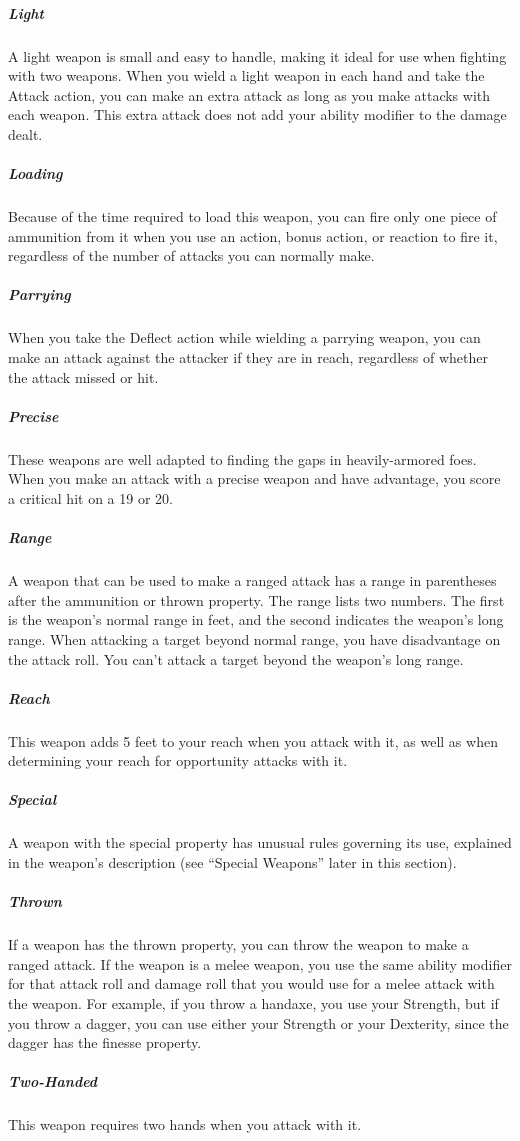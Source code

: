 \subparagraph*{Light} A light weapon is small and easy to handle, making it ideal for use when fighting with two weapons. When you wield a light weapon in each hand and take the Attack action, you can make an extra attack as long as you make attacks with each weapon. This extra attack does not add your ability modifier to the damage dealt.

\subparagraph*{Loading} Because of the time required to load this weapon, you can fire only one piece of ammunition from it when you use an action, bonus action, or reaction to fire it, regardless of the number of attacks you can normally make.

\subparagraph*{Parrying} When you take the Deflect action while wielding a parrying weapon, you can make an attack against the attacker if they are in reach, regardless of whether the attack missed or hit.

\subparagraph*{Precise} These weapons are well adapted to finding the gaps in heavily-armored foes. When you make an attack with a precise weapon and have advantage, you score a critical hit on a 19 or 20.

\subparagraph*{Range} A weapon that can be used to make a ranged attack has a range in parentheses after the ammunition or thrown property. The range lists two numbers. The first is the weapon's normal range in feet, and the second indicates the weapon's long range. When attacking a target beyond normal range, you have disadvantage on the attack roll. You can't attack a target beyond the weapon's long range.

\subparagraph*{Reach} This weapon adds 5 feet to your reach when you attack with it, as well as when determining your reach for opportunity attacks with it.

\subparagraph*{Special} A weapon with the special property has unusual rules governing its use, explained in the weapon's description (see “Special Weapons” later in this section).

\subparagraph*{Thrown} If a weapon has the thrown property, you can throw the weapon to make a ranged attack. If the weapon is a melee weapon, you use the same ability modifier for that attack roll and damage roll that you would use for a melee attack with the weapon. For example, if you throw a handaxe, you use your Strength, but if you throw a dagger, you can use either your Strength or your Dexterity, since the dagger has the finesse property.

\subparagraph*{Two-Handed} This weapon requires two hands when you attack with it.


